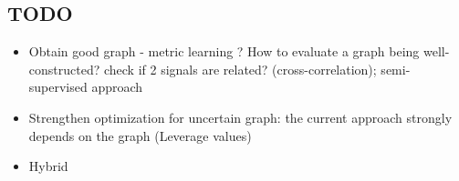 \documentclass{article}
\theoremstyle{definition}
\begin{document}
\subsection{TODO}
\begin{itemize}
	\item Obtain good graph - metric learning ? How to evaluate a graph being well-constructed? check if 2 signals are related? (cross-correlation); semi-supervised approach
	\item Strengthen optimization for uncertain graph: the current approach strongly depends on the graph (Leverage values)
	\item Hybrid 
	
\end{itemize}
\end{document}
